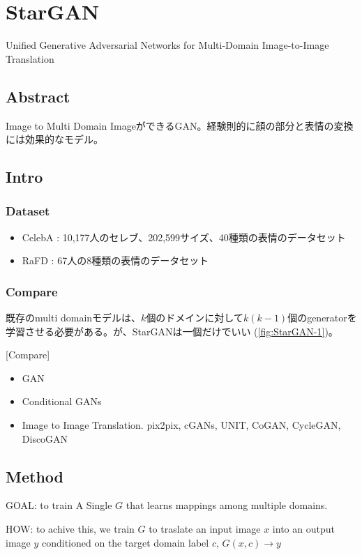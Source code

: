 \documentclass[12pt,fleqn,dvipdfmx]{jarticle}
\begin{document}
  \section{StarGAN}
    Unified Generative Adversarial Networks for Multi-Domain Image-to-Image Translation \cite{StarGAN2018}
  \subsection{Abstract}
    Image to Multi Domain ImageができるGAN。経験則的に顔の部分と表情の変換には効果的なモデル。
  \subsection{Intro}
    \subsubsection{Dataset}
      \begin{itemize}
        \item CelebA\cite{CelebA} : 10,177人のセレブ、202,599サイズ、40種類の表情のデータセット
        \item RaFD\cite{RaFD} : 67人の8種類の表情のデータセット
      \end{itemize}
    \subsubsection{Compare}
      既存のmulti domainモデルは、$k$個のドメインに対して$k(k-1)$個のgeneratorを学習させる必要がある。が、StarGANは一個だけでいい
      (\ref{fig:StarGAN-1})。

      [Compare]

      \begin{itemize}
        \item GAN
        \item Conditional GANs
        \item Image to Image Translation. pix2pix, cGANs, UNIT, CoGAN, CycleGAN, DiscoGAN
      \end{itemize}
  \subsection{Method}
    GOAL: to train A Single $G$ that learns mappings among multiple domains.

    HOW: to achive this, we train $G$ to traslate an input image $x$ into
    an output image $y$ conditioned on the target domain label $c$, $G(x, c) \rightarrow y$
\end{document}

